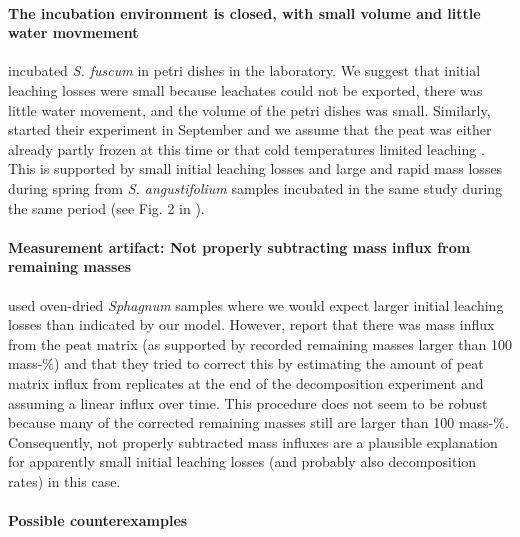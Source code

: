 \documentclass[bg, manuscript]{copernicus}
\begin{document}
\paragraph*{The incubation environment is closed, with small volume and little water movmement}

\citet{Thormann.2002} incubated \emph{S. fuscum} in petri dishes in the laboratory. We suggest that initial leaching losses were small because leachates could not be exported, there was little water movement, and the volume of the petri dishes was small. Similarly, \citet{Golovatskaya.2017} started their experiment in September and we assume that the peat was either already partly frozen at this time or that cold temperatures limited leaching \citep{Lind.2022}. This is supported by small initial leaching losses and large and rapid mass losses during spring from \emph{S. angustifolium} samples incubated in the same study during the same period (see Fig. 2 in \citet{Golovatskaya.2017}).

\paragraph*{Measurement artifact: Not properly subtracting mass influx from remaining masses}

\citet{Trinder.2008} used oven-dried \emph{Sphagnum} samples where we would expect larger initial leaching losses than indicated by our model. However, \citet{Trinder.2008} report that there was mass influx from the peat matrix (as supported by recorded remaining masses larger than 100 mass-\%) and that they tried to correct this by estimating the amount of peat matrix influx from replicates at the end of the decomposition experiment and assuming a linear influx over time. This procedure does not seem to be robust because many of the corrected remaining masses still are larger than 100 mass-\%. Consequently, not properly subtracted mass influxes are a plausible explanation for apparently small initial leaching losses (and probably also decomposition rates) in this case.

\paragraph*{Possible counterexamples}
\end{document}
